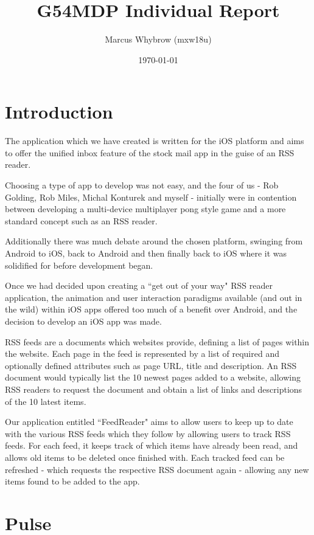 \documentclass[a4paper,11pt]{article}
\title{G54MDP Individual Report}
\author{Marcus Whybrow (mxw18u)} \date{\today}
\begin{document}
    \maketitle
    
    \section{Introduction}
    
    The application which we have created is written for the iOS platform and aims to offer the unified inbox feature of the stock mail app in the guise of an RSS reader.
    
    Choosing a type of app to develop was not easy, and the four of us - Rob Golding, Rob Miles, Michal Konturek and myself - initially were in contention between developing a multi-device multiplayer pong style game and a more standard concept such as an RSS reader.
    
    Additionally there was much debate around the chosen platform, swinging from Android to iOS, back to Android and then finally back to iOS where it was solidified for before development began.
    
    Once we had decided upon creating a ``get out of your way" RSS reader application, the animation and user interaction paradigms available (and out in the wild) within iOS apps offered too much of a benefit over Android, and the decision to develop an iOS app was made.
    
    RSS feeds are a documents which websites provide, defining a list of pages within the website. Each page in the feed is represented by a list of required and optionally defined attributes such as page URL, title and description. An RSS document would typically list the 10 newest pages added to a website, allowing RSS readers to request the document and obtain a list of links and descriptions of the 10 latest items.
    
	Our application entitled ``FeedReader" aims to allow users to keep up to date with the various RSS feeds which they follow by allowing users to track RSS feeds. For each feed, it keeps track of which items have already been read, and allows old items to be deleted once finished with. Each tracked feed can be refreshed - which requests the respective RSS document again - allowing any new items found to be added to the app.
    
    \section{Pulse}
    
\end{document}
